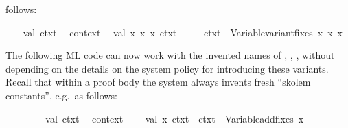 \begin{isabellebody}
\begin{isamarkuptext}
  follows:%
\end{isamarkuptext}%
\isamarkuptrue%
%
\isadelimML
%
\endisadelimML
%
\isatagML
{}\isamarkupfalse%
\ {}\isanewline
\ \ val\ ctxt{}\ {}\ %
\isaantiq
context{}%
\endisaantiq
{}\isanewline
\ \ val\ {}{}x{}{}\ x{}{}\ x{}{}{}\ ctxt{}{}\ {}\isanewline
\ \ \ \ ctxt{}\ {}{}\ Variable{}variant{}fixes\ {}{}x{}{}\ {}x{}{}\ {}x{}{}{}\isanewline
{}%
\endisatagML
{\isafoldML}%
%
\isadelimML
%
\endisadelimML
%
\begin{isamarkuptext}%
The following ML code can now work with the invented names of
  , , , without depending on
  the details on the system policy for introducing these variants.
  Recall that within a proof body the system always invents fresh
  ``skolem constants'', e.g.\ as follows:%
\end{isamarkuptext}%
\isamarkuptrue%
\isamarkupfalse%
\isanewline
{}\isanewline
%
\isadelimML
\ \ %
\endisadelimML
%
\isatagML
{}\isamarkupfalse%
\ {}\isanewline
\ \ \ \ val\ ctxt{}\ {}\ %
\isaantiq
context{}%
\endisaantiq
{}\isanewline
\isanewline
\ \ \ \ val\ {}{}x{}{}{}\ ctxt{}{}\ {}\ ctxt{}\ {}{}\ Variable{}add{}fixes\ {}{}x{}{}{}\isanewline

\end{isabellebody}
